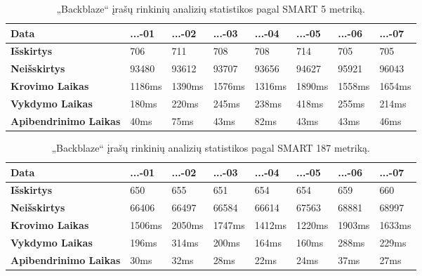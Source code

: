 \documentclass{VUMIFPSkursinis}
\begin{document}
\begin{table}[H]
\centering
\caption{„Backblaze“ įrašų rinkinių analizių statistikos pagal SMART 5 metriką.}
\label{tab:time5}
{\begin{tabular}{|l|l|l|l|l|l|l|l|}
\hline
\textbf{Data}                 & ...-01	   & ...-02     & ...-03     & ...-04 	  & ...-05     & ...-06     & ...-07     \\ \hline
\textbf{Išskirtys}            & 706        & 711        & 708        & 708        & 714        & 705        & 705        \\ \hline
\textbf{Neišskirtys}          & 93480      & 93612      & 93707      & 93656      & 94627      & 95921      & 96043      \\ \hline
\textbf{Krovimo Laikas}       & 1186ms     & 1390ms     & 1576ms     & 1316ms     & 1890ms     & 1558ms     & 1654ms     \\ \hline
\textbf{Vykdymo Laikas}       & 180ms      & 220ms      & 245ms      & 238ms      & 418ms      & 255ms      & 214ms      \\ \hline
\textbf{Apibendrinimo Laikas} & 40ms       & 75ms       & 43ms       & 82ms       & 43ms       & 43ms       & 46ms       \\ \hline
\end{tabular}}
\end{table}

\begin{table}[H]
\centering
\caption{„Backblaze“ įrašų rinkinių analizių statistikos pagal SMART 187 metriką.}
\label{tab:time187}
\begin{tabular}{|l|l|l|l|l|l|l|l|}
\hline
\textbf{Data}                 & ...-01	   & ...-02     & ...-03     & ...-04 	  & ...-05     & ...-06     & ...-07     \\ \hline
\textbf{Išskirtys}            & 650        & 655        & 651        & 654        & 654        & 659        & 660        \\ \hline
\textbf{Neišskirtys}          & 66406      & 66497      & 66584      & 66614      & 67563      & 68881      & 68997      \\ \hline
\textbf{Krovimo Laikas}       & 1506ms     & 2050ms     & 1747ms     & 1412ms     & 1220ms     & 1903ms     & 1633ms     \\ \hline
\textbf{Vykdymo Laikas}       & 196ms      & 314ms      & 200ms      & 164ms      & 160ms      & 288ms      & 229ms      \\ \hline
\textbf{Apibendrinimo Laikas} & 30ms       & 32ms       & 28ms       & 22ms       & 24ms       & 37ms       & 27ms       \\ \hline
\end{tabular}
\end{table}
\end{document}
